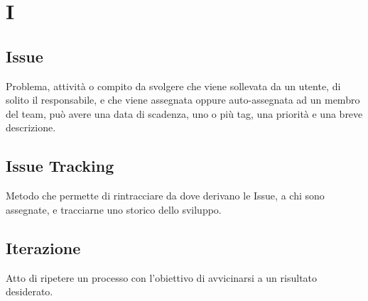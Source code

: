 \section*{I}

\subsection{Issue}
Problema, attività o compito da svolgere che viene sollevata da un utente, di solito il responsabile, e che viene assegnata oppure auto-assegnata ad un membro del team, può avere una data di scadenza, uno o più tag, una priorità e una breve descrizione.

\subsection{Issue Tracking}
Metodo che permette di rintracciare da dove derivano le Issue, a chi sono assegnate, e tracciarne uno storico dello sviluppo.

\subsection{Iterazione}
Atto di ripetere un processo con l'obiettivo di avvicinarsi a un risultato desiderato.